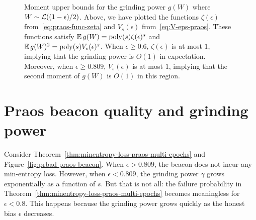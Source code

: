   \begin{figure}[!htb]
    \centering
    \caption[GP moment bounds for Praos]{
      Moment upper bounds for the grinding power $g(W)$ 
      where $W \sim \mathcal{L}((1-\epsilon)/2)$.
      Above, we have plotted the functions $\zeta(\epsilon)$ 
      from~\eqref{eq:praos-func-zeta}
      and $V_s(\epsilon)$ from~\eqref{eq:V-eps-praos}. 
      These functions satisfy 
      $\operatorname{\mathbb{E}} g(W) = \mathrm{poly}(s) \zeta(\epsilon)^s$ and $\operatorname{\mathbb{E}} g(W)^2 = \mathrm{poly}(s) V_s(\epsilon)^s$. 
      When $\epsilon \geq 0.6$, $\zeta(\epsilon)$ is at most $1$, 
      implying that the grinding power is $O(1)$ in expectation.
      Moreover, when $\epsilon \geq 0.809$, $V_s(\epsilon)$ is at most $1$, 
      implying that the second moment of $g(W)$ is $O(1)$ in this region. 
    }
    \label{fig:praos-gp-moments-exact}
  \end{figure}


\section{Praos beacon quality and grinding power}
Consider Theorem~\ref{thm:minentropy-loss-praos-multi-epochs} 
and Figure~\ref{fig:prbad-praos-beacon}.
When $\epsilon > 0.809$, 
the beacon does not incur any min-entropy loss. 
However, when $\epsilon < 0.809$, 
the grinding power $\gamma$ grows exponentially as a function of $s$. 
But that is not all: 
the failure probability in Theorem~\ref{thm:minentropy-loss-praos-multi-epochs} 
becomes meaningless for $\epsilon < 0.8$. 
This happens because the grinding power grows quickly 
as the honest bias $\epsilon$ decreases.

